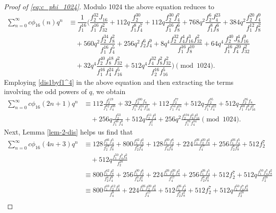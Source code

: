 \documentclass[12pt]{article}
\numberwithin{equation}{section}
\theoremstyle{plain}
\numberwithin{theorem}{section}
\theoremstyle{definition}
\theoremstyle{remark}
\begin{document}
    \begin{proof}[Proof of \eqref{eq:c_phi_1024}]
        Modulo 1024 the above equation reduces to
	\begin{align*}
		\sum_{n=0}^{\infty}c\phi_{16}(n)q^n&\equiv\dfrac{1}{f^{16}_{1}} \bigg (\dfrac{f_2^{32}J_{16}}{f_1^{16}f_{32}^2} +112q\dfrac{f_2^{30}}{f_1^8f_4^7} +112q\dfrac{f_2^{30}f_4^7}{f_1^{16}f_8^6} +768q^2\dfrac{f_2^6J_4^{23}}{f_1^8f_8^6}+384q^2\dfrac{f_2^{20}f_4^9}{f_1^{12}f_8^2}\nonumber \\&\quad  +560q^2\dfrac{f_2^{34}f_8^2}{f_1^{16}f_4^5}+256q^2f_2^6f_4^9\nonumber +8q^4\dfrac{f_2^{32}f_4^4f_{16}^3f_{32}^2}{f_1^{16}f_8^{10}} +64q^4\dfrac{f_2^{40}J_8^4f_{16}^9}{f_1^{16}f_4^{20}f_{32}^2}\nonumber \\&\quad +32q^4\dfrac{f_2^{40}f_8^{18}f_{32}^2}{f_1^{16}f_4^{24}f_{16}^5}\nonumber +512q^4\dfrac{f_4^{32}f_8^2f_{32}^2}{f_2^{16}f_{16}^5}\nonumber\bigg )\pmod{1024}.
	\end{align*}
	Employing \eqref{dis1byf1^4} in the above equation and then extracting the terms involving the odd powers of $q$, we obtain
	\begin{align*}
		\sum_{n=0}^{\infty}c\phi_{16}(2n+1)q^n&\equiv 112\frac{f_2^{119}}{f_1^{82} f_4^{38}}+32\frac{f_2^{100}f_8 }{f_1^{76} f_4^{24} f_{16}^2}+112\frac{f_2^{77}}{f_1^{54} f_4^{24}}+512q\frac{f_2^{95}}{f_1^{74} f_4^{22}}+512q\frac{f_2^{76}f_8 }{f_1^{68} f_4^8 f_{16}^2}\\&\quad+256q\frac{f_2^{53}}{f_1^{46} f_4^8}+512q\frac{f_2^{11}f_4^2 }{f_1^2}+ 256q^2\frac{f_2^{104}f_8^3 f_{16}^2 }{f_1^{76} f_4^{34}}\pmod{1024}.
	\end{align*}
	Next, Lemma \ref{lem-2-dis} helps us find that
	\begin{align*}
			\sum_{n=0}^{\infty}c\phi_{16}(4n+3)q^n&\equiv128\frac{f_1^{46}f_4^5 }{f_2^{18} f_8^2}+800\frac{f_1^{42}f_8^2 }{f_2^4 f_4^9}+128\frac{f_1^{30}f_2^6 }{f_4^3 f_8^2}+224\frac{f_1^{26}f_2^{20} f_8^2 }{f_4^{17}}+256\frac{f_1^{26}f_4^5 }{f_2^8 f_8^2}+512 f_2^7\\&\quad+512q\frac{f_1^{50}f_4^7 f_8^2 }{f_2^{28}}\\
            &\equiv800\frac{f_1^{42}f_8^2 }{f_2^4 f_4^9}+256\frac{f_1^{30}f_2^6 }{f_4^3 f_8^2}+224\frac{f_1^{26}f_2^{20} f_8^2 }{f_4^{17}}+256\frac{f_1^{26}f_4^5 }{f_2^8 f_8^2}+512 f_2^7+512q\frac{f_1^{50}f_4^7 f_8^2 }{f_2^{28}}\\
            &\equiv800\frac{f_1^{10}f_2^{12}f_8^2}{f_4^9}+224\frac{f_1^{26}f_2^{20} f_8^2 }{f_4^{17}}+512\frac{f_1^{26}f_4^5 }{f_2^8 f_8^2}+512 f_2^7+512q\frac{f_1^{50}f_4^7 f_8^2 }{f_2^{28}}\\

\end{align*}
\end{proof}
\end{document}
